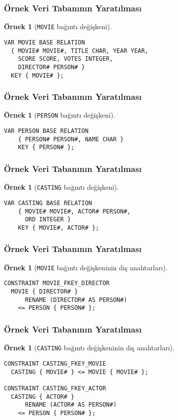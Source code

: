 \documentclass[dvipsnames]{beamer}
\theoremstyle{definition}
\theoremstyle{example}
\newtheorem{ornek}[theorem]{Örnek}
\theoremstyle{plain}
\begin{document}
\begin{frame}[fragile]
  \frametitle{Örnek Veri Tabanının Yaratılması}

  \begin{ornek}[\texttt{MOVIE} bağıntı değişkeni]
    \begin{lstlisting}
VAR MOVIE BASE RELATION
  { MOVIE# MOVIE#, TITLE CHAR, YEAR YEAR,
    SCORE SCORE, VOTES INTEGER,
    DIRECTOR# PERSON# }
  KEY { MOVIE# };
    \end{lstlisting}
  \end{ornek}
\end{frame}

\begin{frame}[fragile]
  \frametitle{Örnek Veri Tabanının Yaratılması}

  \begin{ornek}[\texttt{PERSON} bağıntı değişkeni]
    \begin{lstlisting}
VAR PERSON BASE RELATION
    { PERSON# PERSON#, NAME CHAR }
    KEY { PERSON# };
    \end{lstlisting}
  \end{ornek}
\end{frame}

\begin{frame}[fragile]
  \frametitle{Örnek Veri Tabanının Yaratılması}

  \begin{ornek}[\texttt{CASTING} bağıntı değişkeni]
    \begin{lstlisting}
VAR CASTING BASE RELATION
    { MOVIE# MOVIE#, ACTOR# PERSON#,
      ORD INTEGER }
    KEY { MOVIE#, ACTOR# };
    \end{lstlisting}
  \end{ornek}
\end{frame}

\begin{frame}[fragile]
  \frametitle{Örnek Veri Tabanının Yaratılması}

  \begin{ornek}[\texttt{MOVIE} bağıntı değişkeninin dış anahtarları]
    \begin{lstlisting}
CONSTRAINT MOVIE_FKEY_DIRECTOR
  MOVIE { DIRECTOR# }
      RENAME (DIRECTOR# AS PERSON#)
    <= PERSON { PERSON# };
    \end{lstlisting}
  \end{ornek}
\end{frame}

\begin{frame}[fragile]
  \frametitle{Örnek Veri Tabanının Yaratılması}

  \begin{ornek}[\texttt{CASTING} bağıntı değişkeninin dış anahtarları]
    \begin{lstlisting}
CONSTRAINT CASTING_FKEY_MOVIE
  CASTING { MOVIE# } <= MOVIE { MOVIE# };

CONSTRAINT CASTING_FKEY_ACTOR
  CASTING { ACTOR# }
      RENAME (ACTOR# AS PERSON#)
    <= PERSON { PERSON# };
    \end{lstlisting}
  \end{ornek}
\end{frame}
\end{document}
